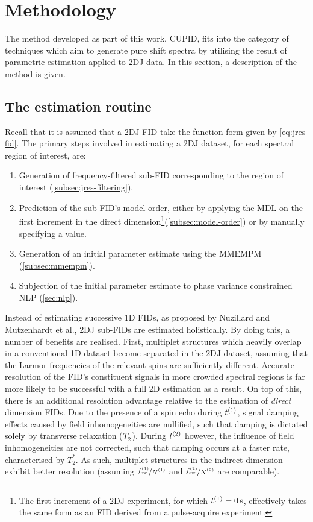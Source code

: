 \section{Methodology}
The method developed as part of this work, \ac{CUPID}, fits into the category
of techniques which aim to generate pure shift spectra by utilising the result of
parametric estimation applied to \ac{2DJ} data.
In this section, a description of the method is given.

\subsection{The estimation routine}
Recall that it is assumed that a \ac{2DJ} \ac{FID} take the function form given
by \cref{eq:jres-fid}. The primary steps involved in estimating a \ac{2DJ}
dataset, for each spectral region of interest, are:
\begin{enumerate}
    \item Generation of frequency-filtered sub-\ac{FID} corresponding to
        the region of interest (\cref{subsec:jres-filtering}).
    \item Prediction of the sub-\ac{FID}'s model order, either by applying the
        \ac{MDL} on the first increment in the direct dimension\footnote{
            The first increment of a \ac{2DJ} experiment, for which $t^{(1)} =
            \qty{0}{\second}$, effectively takes the same form as an \ac{FID}
            derived from a pulse-acquire experiment.
        }(\cref{subsec:model-order}) or
        by manually specifying a
        value.
    \item Generation of an initial parameter estimate using the \ac{MMEMPM}
        (\cref{subsec:mmempm}).
    \item Subjection of the initial parameter estimate to phase variance
        constrained \ac{NLP} (\cref{sec:nlp}).
\end{enumerate}
Instead of estimating successive \ac{1D} \acp{FID}, as proposed by
Nuzillard and Mutzenhardt et al., \ac{2DJ} sub-\acp{FID} are estimated
holistically. By doing this, a number of benefits are realised.
First, multiplet structures which heavily overlap in a
conventional \ac{1D} dataset become separated in the \ac{2DJ} dataset, assuming
that the Larmor frequencies of the relevant spins are sufficiently different.
Accurate resolution of the \ac{FID}'s constituent signals in more crowded spectral
regions is far more likely to be successful with a full \ac{2D} estimation as a
result.
On top of this, there is an additional resolution advantage relative to the
estimation of \emph{direct} dimension \acp{FID}. Due to the presence of a spin
echo during $t^{(1)}$, signal damping effects caused by field inhomogeneities are
nullified, such that damping is dictated solely by transverse relaxation
($T_2^{\vphantom{*}}$). During $t^{(2)}$ however, the influence of field inhomogeneities are not
corrected, such that damping occurs at a faster rate, characterised by $T_2^*$.
As such, multiplet structures in the indirect dimension exhibit better
resolution (assuming $\nicefrac{\fswone}{\None}$ and
$\nicefrac{\fswtwo}{\Ntwo}$ are comparable).

